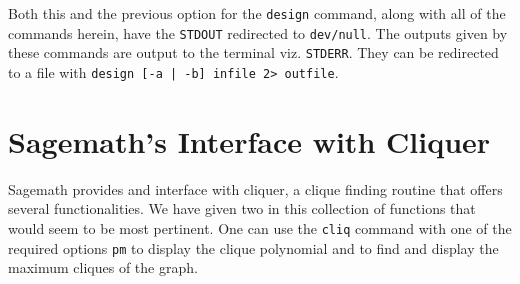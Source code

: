 \documentclass[a4paper,10pt]{article}
\begin{document}
Both this and the previous option for the {\tt design} command, along with all of the commands herein, have the {\tt STDOUT} redirected to {\tt dev/null}. The outputs given by these commands are output to the terminal viz. {\tt STDERR}. They can be redirected to a file with {\tt design [-a | -b] infile 2> outfile}.

\section{\centering\sc Sagemath's Interface with Cliquer}

Sagemath provides and interface with cliquer, a clique finding routine that offers several functionalities. We have given two in this collection of functions that would seem to be most pertinent. One can use the {\tt cliq} command with one of the required options {\tt pm} to display the clique polynomial and to find and display the maximum cliques of the graph.
\end{document}
